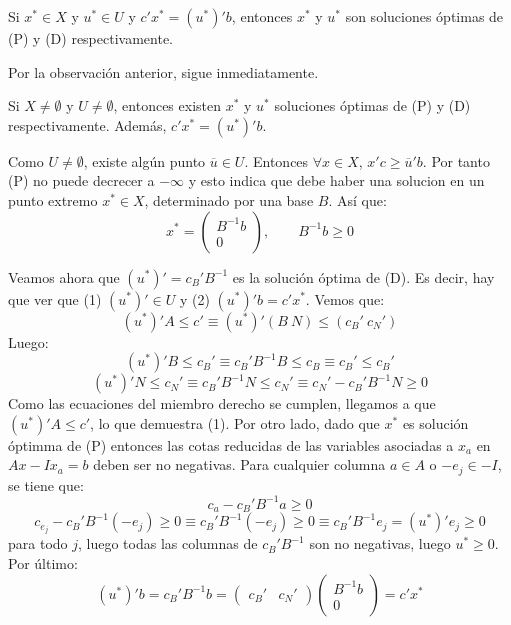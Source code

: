 \documentclass[PM.tex]{subfiles}
\begin{document}
\begin{coro}
Si $x^* \in X$ y $u^* \in U$ y $c'x^* = (u^*)'b$, entonces $x^*$ y $u^*$ son soluciones óptimas de (P) y (D) respectivamente.
\end{coro}

\begin{dem}
Por la observación anterior, sigue inmediatamente.
\end{dem}

\begin{theorem}
Si $X \neq \emptyset$ y $U \neq \emptyset$, entonces existen $x^*$ y $u^*$ soluciones óptimas de (P) y (D) respectivamente. Además, $c'x^* = (u^*)'b$.
\end{theorem}

\begin{dem}
Como $U \neq \emptyset$, existe algún punto $\overline{u} \in U$. Entonces $\forall x \in X$, $x'c ≥ \overline{u}'b$. Por tanto (P) no puede decrecer a $-\infty$ y esto indica que debe haber una solucion en un punto extremo $x^* \in X$, determinado por una base $B$. Así que:
\[ x^* = \begin{pmatrix}B^{-1} b \\ 0\end{pmatrix}, \qquad B^{-1}b ≥ 0 \]

Veamos ahora que $(u^*)' = c_B'B^{-1}$ es la solución óptima de (D). Es decir, hay que ver que (1) $(u^*)' \in U$ y (2) $(u^*)'b = c'x^*$. Vemos que:
\[ (u^*)'A ≤ c' \equiv (u^*)' (B \ N) ≤ (c_B' \ c_N') \]
Luego:
\[ (u^*)'B ≤ c_B' \equiv c_B'B^{-1}B ≤ c_B \equiv c_B' ≤ c_B'\]
\[ (u^*)'N ≤ c_N' \equiv c_B'B^{-1}N ≤ c_N' \equiv c_N' - c_B'B^{-1}N ≥ 0\]
Como las ecuaciones del miembro derecho se cumplen, llegamos a que $(u^*)'A ≤ c'$, lo que demuestra (1). Por otro lado, dado que $x^*$ es solución óptimma de (P) entonces las cotas reducidas de las variables asociadas a $x_a$ en $Ax - I x_a = b$ deben ser no negativas. Para cualquier columna $a \in A$ o $-e_j \in -I$, se tiene que:
\[ c_a - c_B' B^{-1} a ≥ 0 \]
\[ c_{e_j} - c_B' B^{-1}(-e_j) ≥ 0 \equiv  c_B'B^{-1}(-e_j) ≥ 0 \equiv c_B'B^{-1}e_j = (u^*)'e_j ≥ 0 \]
para todo $j$, luego todas las columnas de $c_B'B^{-1}$ son no negativas, luego $u^* ≥ 0$. Por último:
\[ (u^*)'b = c_B'B^{-1}b = \begin{pmatrix}c_B' & c_N'\end{pmatrix}\begin{pmatrix}B^{-1}b\\0\end{pmatrix} = c'x^* \]
\end{dem}
\end{document}
